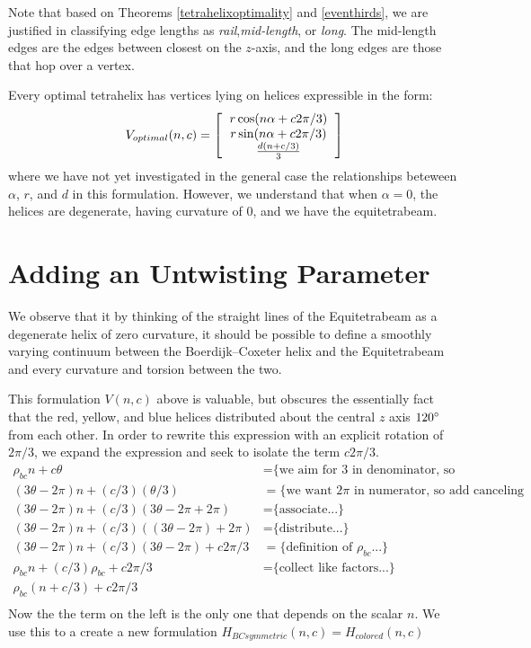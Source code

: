 \documentclass[11pt]{article}
\begin{document}
Note that based on Theorems \ref{tetrahelixoptimality} and \ref{eventhirds}, we are justified in classifying edge lengths as \emph{rail},\emph{mid-length}, or
\emph{long}. The mid-length edges are the edges between closest on the $z$-axis, and the long edges are those that hop over a vertex.

Every optimal tetrahelix has vertices lying on helices expressible in the form:
\[
V_{optimal}(n,c) =
\left [
  \begin{tabular}{c}
   $ r \cos(n \alpha +  c 2 \pi /3)$\\
   $ r \sin(n \alpha +  c 2 \pi /3) $\\
   $ \frac{d(n +c / 3)}{3}   $
  \end{tabular}
\right ]
\]
where we have not yet investigated in the general case the relationships beteween $\alpha$, $r$, and $d$ in this formulation.
However, we understand that when $\alpha = 0$, the helices are degenerate, having curvature of $0$, and
we have the equitetrabeam.






\section{Adding an Untwisting Parameter}

We observe that it by thinking of the straight lines of the Equitetrabeam as a degenerate helix of zero curvature,
it should be possible to define a smoothly varying continuum between the Boerdijk--Coxeter helix and the Equitetrabeam and every
curvature and torsion between the two.

This formulation $V(n,c)$ above is valuable, but obscures the essentially fact that the red, yellow, and blue helices distributed
about the central $z$ axis $120\degree$ from each other.
In order to rewrite this expression with an explicit rotation of $2\pi/3$, we expand 
the expression and seek to isolate the term $c2\pi/3$.
\begin{align*}
  \rho_{bc} n + c \theta  &=   \text{\{we aim for 3 in denominator, so we split...\}} \\
    (3 \theta - 2 \pi)n + (c/3)  (\theta /3)  &=   \text{\{we want $2\pi$ in numerator, so add canceling terms...\}} \\
  (3 \theta - 2 \pi)n + (c/ 3) (3 \theta - 2 \pi  + 2 \pi) &=  \text{\{associate...\}} \\
  (3 \theta - 2 \pi)n + (c/ 3) ((3 \theta - 2 \pi)  + 2 \pi) &=  \text{\{distribute...\}} \\  
  (3 \theta - 2 \pi)n + (c / 3) (3 \theta - 2 \pi)  + c 2 \pi /3 &=  \text{\{definition of $\rho_{bc}$...\}} \\
  \rho_{bc} n + (c / 3) \rho_{bc}  + c 2 \pi /3 &=  \text{\{collect like factors...\}} \\  
  \rho_{bc} (n + c/3)  + c 2 \pi /3  \\
\end{align*}
Now the the term on the left is the only one that depends on the scalar $n$. We use this to a create
a new formulation $H_{BCsymmetric}(n,c) = H_{colored}(n,c)$
\end{document}
